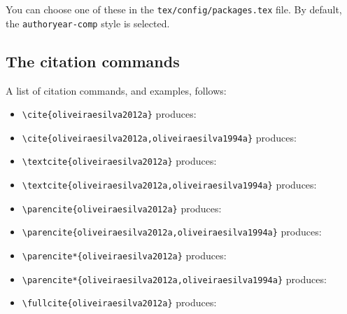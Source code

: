 You can choose one of these in the \verb+tex/config/packages.tex+ file.
By default, the \verb+authoryear-comp+ style is selected.


\subsection{The citation commands}
\label{c3:ss:the-citation-commands}

A list of citation commands, and examples, follows:

\begin{itemize}

\item
\verb+\cite{oliveiraesilva2012a}+ produces:\\
\cite{oliveiraesilva2012a}

\item
\verb+\cite{oliveiraesilva2012a,oliveiraesilva1994a}+ produces:\\
\cite{oliveiraesilva2012a,oliveiraesilva1994a}

\item
\verb+\textcite{oliveiraesilva2012a}+ produces:\\
\textcite{oliveiraesilva2012a}

\item
\verb+\textcite{oliveiraesilva2012a,oliveiraesilva1994a}+ produces:\\
\textcite{oliveiraesilva2012a,oliveiraesilva1994a}

\item
\verb+\parencite{oliveiraesilva2012a}+ produces:\\
\parencite{oliveiraesilva2012a}

\item
\verb+\parencite{oliveiraesilva2012a,oliveiraesilva1994a}+ produces:\\
\parencite{oliveiraesilva2012a,oliveiraesilva1994a}

\item
\verb+\parencite*{oliveiraesilva2012a}+ produces:\\
\parencite*{oliveiraesilva2012a}

\item
\verb+\parencite*{oliveiraesilva2012a,oliveiraesilva1994a}+ produces:\\
\parencite*{oliveiraesilva2012a,oliveiraesilva1994a}

\item
\verb+\fullcite{oliveiraesilva2012a}+ produces:\\

\end{itemize}

